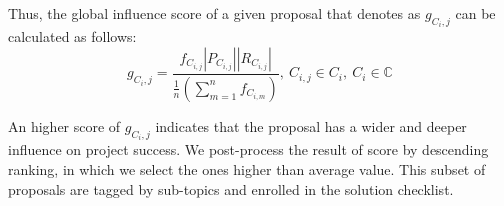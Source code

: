 Thus, the global influence score of a given proposal that denotes as $g_{C_{i},j}$ can be calculated as follows:
\begin{equation}
g_{C_{i},j} =
\frac
{f_{C_{i,j}} |P_{C_{i,j}}| |R_{C_{i,j}}|} 
{\frac{1}{n}\left (\sum_{m=1}^n{f_{C_{i,m}}}\right)}
,\ 
C_{i,j} \in C_{i},\ C_{i} \in \mathbb{C}
\label{final}
\end{equation}

An higher score of $g_{C_{i},j}$ indicates that the proposal has a wider and deeper influence on project success. We post-process the result of score by descending ranking, in which we select the ones higher than average value. This subset of proposals are tagged by sub-topics and enrolled in the solution checklist.

